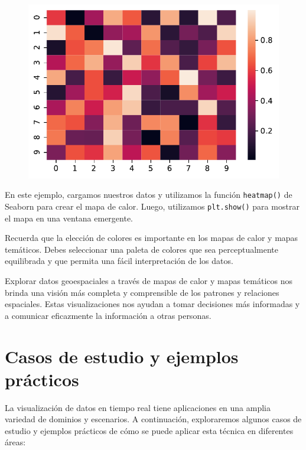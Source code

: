 \documentclass[
  a4paper,
]{article}
\begin{document}
\begin{figure}[H]

{\centering \includegraphics{index_files/figure-pdf/cell-8-output-1.pdf}

}

\end{figure}

En este ejemplo, cargamos nuestros datos y utilizamos la función
\texttt{heatmap()} de Seaborn para crear el mapa de calor. Luego,
utilizamos \texttt{plt.show()} para mostrar el mapa en una ventana
emergente.

Recuerda que la elección de colores es importante en los mapas de calor
y mapas temáticos. Debes seleccionar una paleta de colores que sea
perceptualmente equilibrada y que permita una fácil interpretación de
los datos.

Explorar datos geoespaciales a través de mapas de calor y mapas
temáticos nos brinda una visión más completa y comprensible de los
patrones y relaciones espaciales. Estas visualizaciones nos ayudan a
tomar decisiones más informadas y a comunicar eficazmente la información
a otras personas.

\hypertarget{casos-de-estudio-y-ejemplos-pruxe1cticos}{%
\section{Casos de estudio y ejemplos
prácticos}\label{casos-de-estudio-y-ejemplos-pruxe1cticos}}

La visualización de datos en tiempo real tiene aplicaciones en una
amplia variedad de dominios y escenarios. A continuación, exploraremos
algunos casos de estudio y ejemplos prácticos de cómo se puede aplicar
esta técnica en diferentes áreas:
\end{document}
